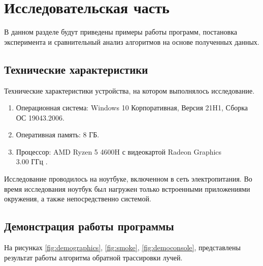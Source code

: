 \chapter{Исследовательская часть}

В данном разделе будут приведены примеры работы программ, постановка эксперимента и сравнительный анализ алгоритмов на основе полученных данных.

\section{Технические характеристики}

Технические характеристики устройства, на котором выполнялось исследование.

\begin{enumerate}
	\item Операционная система: Windows 10 Корпоративная, Версия	21H1, Сборка ОС 19043.2006.
	\item Оперативная память: 8 ГБ.
	\item Процессор: AMD Ryzen 5 4600H с видеокартой Radeon Graphics \\3.00 ГГц \cite{processor}.
\end{enumerate}

Исследование проводилось на ноутбуке, включенном в сеть электропитания. Во время исследования ноутбук был нагружен только встроенными приложениями окружения, а также непосредственно системой.

\section{Демонстрация работы программы}

На рисунках \ref{fig:demographics}, \ref{fig:smoke}, \ref{fig:democonsole}, представлены результат работы алгоритма обратной трассировки лучей.

